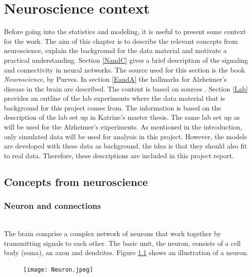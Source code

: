 
\chapter{Neuroscience context}

Before going into the statistics and modeling, it is useful to present some context for the work. The aim of this chapter is to describe the relevant concepts from neuroscience, explain the background for the data material and motivate a practical understanding. Section \ref{NandC} gives a brief description of the signaling and connectivity in neural networks. The source used for this section is the book \textit{Neuroscience}, by Purves. In section \ref{EandA} the hallmarks for Alzheimer's disease in the brain are described. The content is based on sources \cite{Gomez,Witter:2011, Alz}. Section \ref{Lab} provides an outline of the lab experiments where the data material that is background for this project comes from. The information is based on the description of the lab set up in Katrine's master thesis. The same lab set up as will be used for the Alzheimer's experiments. As mentioned in the introduction, only simulated data will be used for analysis in this project. However, the models are developed with these data as background, the idea is that they should also fit to real data. Therefore, these descriptions are included in this project report.  



\section{Concepts from neuroscience}


\subsection{Neuron and connections}\\
\label{NandC}
The brain comprise a complex network of neurons that work together by transmitting signals to each other. The basic unit, the neuron, 
 consists of a cell body (soma), an axon and dendrites. Figure \ref{neuron} shows an illustration of a neuron.
\begin{figure}[h]
    \caption{}
    \label{neuron}
    \centering
    \texttt{[image: Neuron.jpeg]}
\end{figure} 

